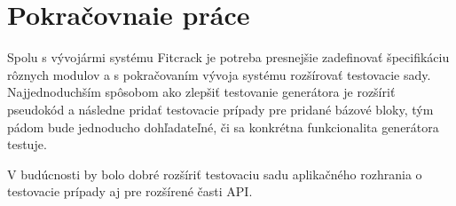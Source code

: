 \section{Pokračovnaie práce}
Spolu s vývojármi systému Fitcrack je potreba presnejšie zadefinovať špecifikáciu rôznych modulov a s pokračovaním vývoja systému rozšírovať testovacie sady.
Najjednoduchším spôsobom ako zlepšiť testovanie generátora je rozšíriť pseudokód a následne pridať testovacie prípady pre pridané bázové bloky, tým pádom bude jednoducho dohľadateľné, či sa konkrétna funkcionalita generátora testuje.

V budúcnosti by bolo dobré rozšíriť testovaciu sadu aplikačného rozhrania o testovacie prípady aj pre rozšírené časti API.
